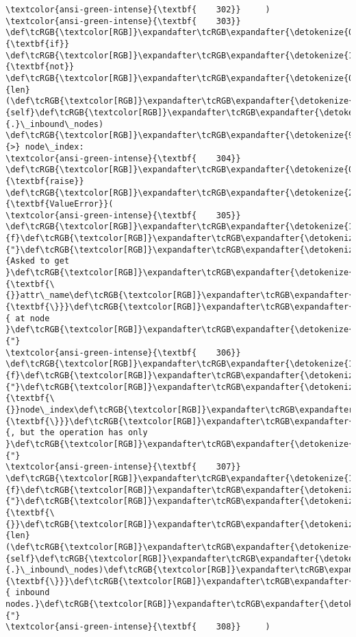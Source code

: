 \documentclass[11pt]{article}
\begin{document}
\begin{Verbatim}[commandchars=\\\{\}, frame=single, framerule=2mm, rulecolor=\color{outerrorbackground}]
\textcolor{ansi-green-intense}{\textbf{    302}}     )
\textcolor{ansi-green-intense}{\textbf{    303}} \def\tcRGB{\textcolor[RGB]}\expandafter\tcRGB\expandafter{\detokenize{0,135,0}}{\textbf{if}} \def\tcRGB{\textcolor[RGB]}\expandafter\tcRGB\expandafter{\detokenize{175,0,255}}{\textbf{not}} \def\tcRGB{\textcolor[RGB]}\expandafter\tcRGB\expandafter{\detokenize{0,135,0}}{len}(\def\tcRGB{\textcolor[RGB]}\expandafter\tcRGB\expandafter{\detokenize{0,135,0}}{self}\def\tcRGB{\textcolor[RGB]}\expandafter\tcRGB\expandafter{\detokenize{98,98,98}}{.}\_inbound\_nodes) \def\tcRGB{\textcolor[RGB]}\expandafter\tcRGB\expandafter{\detokenize{98,98,98}}{>} node\_index:
\textcolor{ansi-green-intense}{\textbf{    304}}     \def\tcRGB{\textcolor[RGB]}\expandafter\tcRGB\expandafter{\detokenize{0,135,0}}{\textbf{raise}} \def\tcRGB{\textcolor[RGB]}\expandafter\tcRGB\expandafter{\detokenize{215,95,95}}{\textbf{ValueError}}(
\textcolor{ansi-green-intense}{\textbf{    305}}         \def\tcRGB{\textcolor[RGB]}\expandafter\tcRGB\expandafter{\detokenize{175,0,0}}{f}\def\tcRGB{\textcolor[RGB]}\expandafter\tcRGB\expandafter{\detokenize{175,0,0}}{"}\def\tcRGB{\textcolor[RGB]}\expandafter\tcRGB\expandafter{\detokenize{175,0,0}}{Asked to get }\def\tcRGB{\textcolor[RGB]}\expandafter\tcRGB\expandafter{\detokenize{175,95,135}}{\textbf{\{}}attr\_name\def\tcRGB{\textcolor[RGB]}\expandafter\tcRGB\expandafter{\detokenize{175,95,135}}{\textbf{\}}}\def\tcRGB{\textcolor[RGB]}\expandafter\tcRGB\expandafter{\detokenize{175,0,0}}{ at node }\def\tcRGB{\textcolor[RGB]}\expandafter\tcRGB\expandafter{\detokenize{175,0,0}}{"}
\textcolor{ansi-green-intense}{\textbf{    306}}         \def\tcRGB{\textcolor[RGB]}\expandafter\tcRGB\expandafter{\detokenize{175,0,0}}{f}\def\tcRGB{\textcolor[RGB]}\expandafter\tcRGB\expandafter{\detokenize{175,0,0}}{"}\def\tcRGB{\textcolor[RGB]}\expandafter\tcRGB\expandafter{\detokenize{175,95,135}}{\textbf{\{}}node\_index\def\tcRGB{\textcolor[RGB]}\expandafter\tcRGB\expandafter{\detokenize{175,95,135}}{\textbf{\}}}\def\tcRGB{\textcolor[RGB]}\expandafter\tcRGB\expandafter{\detokenize{175,0,0}}{, but the operation has only }\def\tcRGB{\textcolor[RGB]}\expandafter\tcRGB\expandafter{\detokenize{175,0,0}}{"}
\textcolor{ansi-green-intense}{\textbf{    307}}         \def\tcRGB{\textcolor[RGB]}\expandafter\tcRGB\expandafter{\detokenize{175,0,0}}{f}\def\tcRGB{\textcolor[RGB]}\expandafter\tcRGB\expandafter{\detokenize{175,0,0}}{"}\def\tcRGB{\textcolor[RGB]}\expandafter\tcRGB\expandafter{\detokenize{175,95,135}}{\textbf{\{}}\def\tcRGB{\textcolor[RGB]}\expandafter\tcRGB\expandafter{\detokenize{0,135,0}}{len}(\def\tcRGB{\textcolor[RGB]}\expandafter\tcRGB\expandafter{\detokenize{0,135,0}}{self}\def\tcRGB{\textcolor[RGB]}\expandafter\tcRGB\expandafter{\detokenize{98,98,98}}{.}\_inbound\_nodes)\def\tcRGB{\textcolor[RGB]}\expandafter\tcRGB\expandafter{\detokenize{175,95,135}}{\textbf{\}}}\def\tcRGB{\textcolor[RGB]}\expandafter\tcRGB\expandafter{\detokenize{175,0,0}}{ inbound nodes.}\def\tcRGB{\textcolor[RGB]}\expandafter\tcRGB\expandafter{\detokenize{175,0,0}}{"}
\textcolor{ansi-green-intense}{\textbf{    308}}     )


\end{Verbatim}
\end{document}
